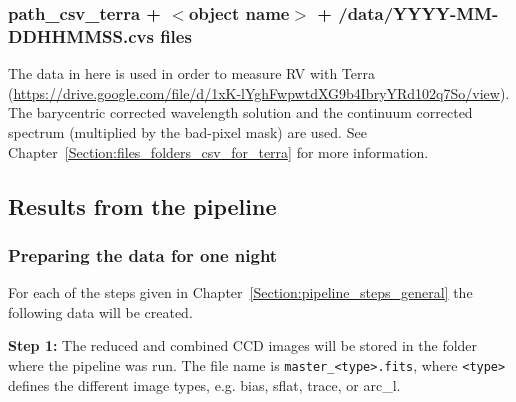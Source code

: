 \documentclass[10pt,a4paper]{article}
\begin{document}
\subsubsection{path\_csv\_terra + $<$object name$>$ + /data/YYYY-MM-DDHHMMSS.cvs files}
The data in here is used in order to measure RV with Terra (\url{https://drive.google.com/file/d/1xK-lYghFwpwtdXG9b4IbryYRd102q7So/view}). The barycentric corrected wavelength solution and the continuum corrected spectrum (multiplied by the bad-pixel mask) are used. See Chapter~\ref{Section:files_folders_csv_for_terra} for more information.

\subsection{Results from the pipeline}

\subsubsection{Preparing the data for one night}
\label{section:results_pipeline}
For each of the steps given in Chapter~\ref{Section:pipeline_steps_general} the following data will be created.

\noindent \textbf{Step 1:} The reduced and combined CCD images will be stored in the folder where the pipeline was run. The file name is \verb|master_<type>.fits|, where \verb|<type>| defines the different image types, e.g. bias, sflat, trace, or arc\_l.
\end{document}
